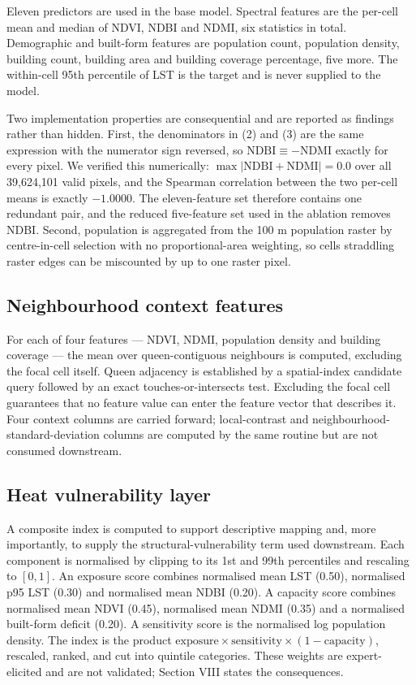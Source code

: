 Eleven predictors are used in the base model. Spectral features are the per-cell mean and median
of NDVI, NDBI and NDMI, six statistics in total. Demographic and built-form features are population
count, population density, building count, building area and building coverage percentage, five
more. The within-cell 95th percentile of LST is the target and is never supplied to the model.

Two implementation properties are consequential and are reported as findings rather than hidden.
First, the denominators in (2) and (3) are the same expression with the numerator sign reversed, so
\(\mathrm{NDBI} \equiv -\mathrm{NDMI}\) exactly for every pixel. We verified this numerically:
\(\max|\mathrm{NDBI} + \mathrm{NDMI}| = 0.0\) over all 39,624,101 valid pixels, and the Spearman
correlation between the two per-cell means is exactly \(-1.0000\). The eleven-feature set therefore
contains one redundant pair, and the reduced five-feature set used in the ablation removes NDBI.
Second, population is aggregated from the 100 m population raster by centre-in-cell selection with
no proportional-area weighting, so cells straddling raster edges can be miscounted by up to one raster
pixel.

\subsection{Neighbourhood context features}\label{d.-neighbourhood-context-features}

For each of four features --- NDVI, NDMI, population density and building coverage --- the mean over
queen-contiguous neighbours is computed, excluding the focal cell itself. Queen adjacency is
established by a spatial-index candidate query followed by an exact touches-or-intersects test.
Excluding the focal cell guarantees that no feature value can enter the feature vector that describes
it. Four context columns are carried forward; local-contrast and neighbourhood-standard-deviation
columns are computed by the same routine but are not consumed downstream.

\subsection{Heat vulnerability layer}\label{e.-heat-vulnerability-layer}

A composite index is computed to support descriptive mapping and, more importantly, to supply the
structural-vulnerability term used downstream. Each component is normalised by clipping to its 1st
and 99th percentiles and rescaling to \([0, 1]\). An exposure score combines normalised mean LST (0.50),
normalised p95 LST (0.30) and normalised mean NDBI (0.20). A capacity score combines normalised mean
NDVI (0.45), normalised mean NDMI (0.35) and a normalised built-form deficit (0.20). A sensitivity
score is the normalised log population density. The index is the product
\(\mathrm{exposure} \times \mathrm{sensitivity} \times (1 - \mathrm{capacity})\), rescaled, ranked, and
cut into quintile categories. These weights are expert-elicited and are not validated; Section VIII
states the consequences.

